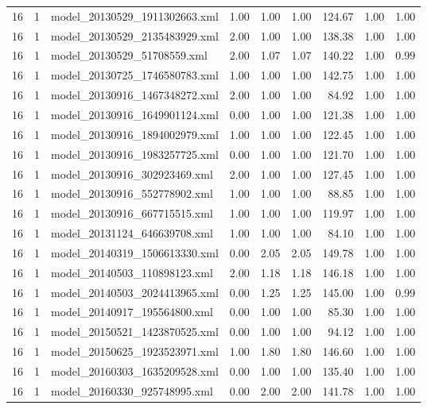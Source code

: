 \begin{table}[ht]
\begin{tabular}{rrlrrrrrr}
   16 &   1 & model\_20130529\_1911302663.xml & 1.00 & 1.00 & 1.00 & 124.67 & 1.00 & 1.00 \\ 
   16 &   1 & model\_20130529\_2135483929.xml & 2.00 & 1.00 & 1.00 & 138.38 & 1.00 & 1.00 \\ 
   16 &   1 & model\_20130529\_51708559.xml & 2.00 & 1.07 & 1.07 & 140.22 & 1.00 & 0.99 \\ 
   16 &   1 & model\_20130725\_1746580783.xml & 1.00 & 1.00 & 1.00 & 142.75 & 1.00 & 1.00 \\ 
   16 &   1 & model\_20130916\_1467348272.xml & 2.00 & 1.00 & 1.00 & 84.92 & 1.00 & 1.00 \\ 
   16 &   1 & model\_20130916\_1649901124.xml & 0.00 & 1.00 & 1.00 & 121.38 & 1.00 & 1.00 \\ 
   16 &   1 & model\_20130916\_1894002979.xml & 1.00 & 1.00 & 1.00 & 122.45 & 1.00 & 1.00 \\ 
   16 &   1 & model\_20130916\_1983257725.xml & 0.00 & 1.00 & 1.00 & 121.70 & 1.00 & 1.00 \\ 
   16 &   1 & model\_20130916\_302923469.xml & 2.00 & 1.00 & 1.00 & 127.45 & 1.00 & 1.00 \\ 
   16 &   1 & model\_20130916\_552778902.xml & 1.00 & 1.00 & 1.00 & 88.85 & 1.00 & 1.00 \\ 
   16 &   1 & model\_20130916\_667715515.xml & 1.00 & 1.00 & 1.00 & 119.97 & 1.00 & 1.00 \\ 
   16 &   1 & model\_20131124\_646639708.xml & 1.00 & 1.00 & 1.00 & 84.10 & 1.00 & 1.00 \\ 
   16 &   1 & model\_20140319\_1506613330.xml & 0.00 & 2.05 & 2.05 & 149.78 & 1.00 & 1.00 \\ 
   16 &   1 & model\_20140503\_110898123.xml & 2.00 & 1.18 & 1.18 & 146.18 & 1.00 & 1.00 \\ 
   16 &   1 & model\_20140503\_2024413965.xml & 0.00 & 1.25 & 1.25 & 145.00 & 1.00 & 0.99 \\ 
   16 &   1 & model\_20140917\_195564800.xml & 0.00 & 1.00 & 1.00 & 85.30 & 1.00 & 1.00 \\ 
   16 &   1 & model\_20150521\_1423870525.xml & 0.00 & 1.00 & 1.00 & 94.12 & 1.00 & 1.00 \\ 
   16 &   1 & model\_20150625\_1923523971.xml & 1.00 & 1.80 & 1.80 & 146.60 & 1.00 & 1.00 \\ 
   16 &   1 & model\_20160303\_1635209528.xml & 0.00 & 1.00 & 1.00 & 135.40 & 1.00 & 1.00 \\ 
   16 &   1 & model\_20160330\_925748995.xml & 0.00 & 2.00 & 2.00 & 141.78 & 1.00 & 1.00 \\ 

\end{tabular}
\end{table}
